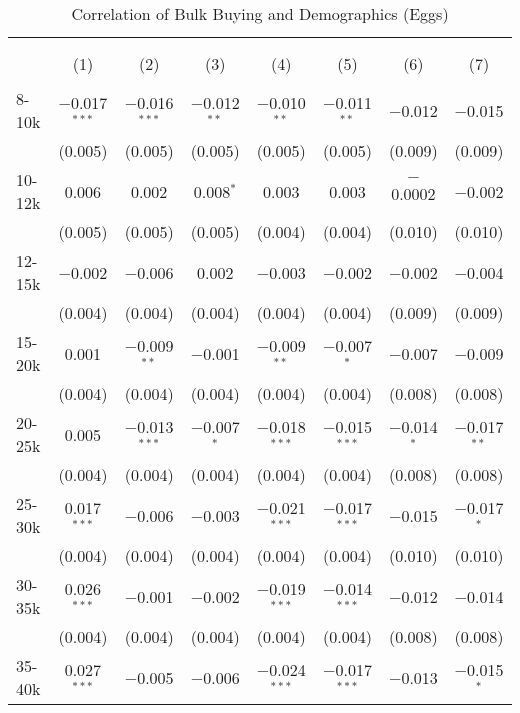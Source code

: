
\begin{table}[!htbp] \centering 
  \caption{Correlation of Bulk Buying and Demographics (Eggs)} 
  \label{tab:discountingBehavior4100} 
\begin{tabular}{@{\extracolsep{5pt}}lccccccc} 
\\[-1.8ex]\hline 
\hline \\[-1.8ex] 
\\[-1.8ex] & (1) & (2) & (3) & (4) & (5) & (6) & (7)\\ 
\hline \\[-1.8ex] 
 8-10k & $-$0.017$^{***}$ & $-$0.016$^{***}$ & $-$0.012$^{**}$ & $-$0.010$^{**}$ & $-$0.011$^{**}$ & $-$0.012 & $-$0.015 \\ 
  & (0.005) & (0.005) & (0.005) & (0.005) & (0.005) & (0.009) & (0.009) \\ 
  10-12k & 0.006 & 0.002 & 0.008$^{*}$ & 0.003 & 0.003 & $-$0.0002 & $-$0.002 \\ 
  & (0.005) & (0.005) & (0.005) & (0.004) & (0.004) & (0.010) & (0.010) \\ 
  12-15k & $-$0.002 & $-$0.006 & 0.002 & $-$0.003 & $-$0.002 & $-$0.002 & $-$0.004 \\ 
  & (0.004) & (0.004) & (0.004) & (0.004) & (0.004) & (0.009) & (0.009) \\ 
  15-20k & 0.001 & $-$0.009$^{**}$ & $-$0.001 & $-$0.009$^{**}$ & $-$0.007$^{*}$ & $-$0.007 & $-$0.009 \\ 
  & (0.004) & (0.004) & (0.004) & (0.004) & (0.004) & (0.008) & (0.008) \\ 
  20-25k & 0.005 & $-$0.013$^{***}$ & $-$0.007$^{*}$ & $-$0.018$^{***}$ & $-$0.015$^{***}$ & $-$0.014$^{*}$ & $-$0.017$^{**}$ \\ 
  & (0.004) & (0.004) & (0.004) & (0.004) & (0.004) & (0.008) & (0.008) \\ 
  25-30k & 0.017$^{***}$ & $-$0.006 & $-$0.003 & $-$0.021$^{***}$ & $-$0.017$^{***}$ & $-$0.015 & $-$0.017$^{*}$ \\ 
  & (0.004) & (0.004) & (0.004) & (0.004) & (0.004) & (0.010) & (0.010) \\ 
  30-35k & 0.026$^{***}$ & $-$0.001 & $-$0.002 & $-$0.019$^{***}$ & $-$0.014$^{***}$ & $-$0.012 & $-$0.014 \\ 
  & (0.004) & (0.004) & (0.004) & (0.004) & (0.004) & (0.008) & (0.008) \\ 
  35-40k & 0.027$^{***}$ & $-$0.005 & $-$0.006 & $-$0.024$^{***}$ & $-$0.017$^{***}$ & $-$0.013 & $-$0.015$^{*}$ \\ 

\end{tabular}
\end{table}
